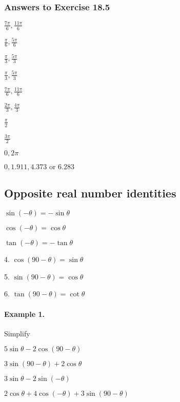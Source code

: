 \documentclass{article}
\begin{document}
\subsubsection {Answers to Exercise 18.5}

\begin{enumerate*}[label=Q\arabic*)]
  \item $\frac{7\pi}{6}, \frac{11\pi}{6}$
  \item $\frac{\pi}{6}, \frac{5\pi}{6}$
  \item $\frac{\pi}{3}, \frac{5\pi}{3}$
  \item $\frac{\pi}{3}, \frac{5\pi}{3}$
  \item $\frac{7\pi}{6}, \frac{11\pi}{6}$
  \item $\frac{2\pi}{3}, \frac{4\pi}{3}$
  \item $\frac{\pi}{2}$
  \item $\frac{3\pi}{2}$
  \item $0, 2\pi$
  \item $0, 1.911, 4.373 \text{ or } 6.283$
\end{enumerate*}

\subsection{Opposite real number identities}

\begin{enumerate}
        \begin{paracol}{2}
          \item $\sin(-\theta) = -\sin\theta$
          \item $\cos(-\theta) = \cos\theta$
          \item $\tan(-\theta) = -\tan\theta$
          \switchcolumn
          \item[4.] $\cos(90-\theta) = \sin\theta$
          \item[5.] $\sin(90-\theta) = \cos\theta$
          \item[6.] $\tan(90-\theta) = \cot\theta$
        \end{paracol}
\end{enumerate}

\paragraph{Example 1.}
Simplify

\begin{enumerate*}[label=\alph*)]
  \item $5\sin\theta - 2\cos(90-\theta)$
  \item $3\sin(90-\theta) + 2\cos\theta$
  \item $3\sin\theta - 2\sin(-\theta)$
  \item $2\cos\theta + 4\cos(-\theta) + 3\sin(90-\theta)$
\end{enumerate*}
\end{document}
